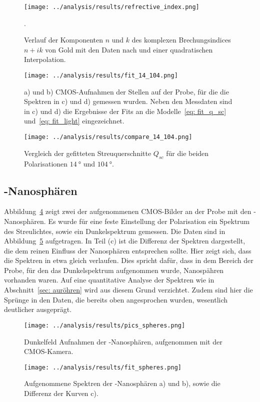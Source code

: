 \begin{figure}
  \centering
  \texttt{[image: ../analysis/results/refrective\_index.png]}
  \caption{Verlauf der Komponenten $n$ und $k$ des komplexen Brechungsindices $n + i k$
  von Gold mit den Daten nach \cite{ref_index_au} und einer quadratischen Interpolation.}.
  \label{fig: ref_index}
\end{figure}


\begin{figure}
  \centering
  \texttt{[image: ../analysis/results/fit\_14\_104.png]}
  \caption{a) und b) CMOS-Aufnahmen der Stellen auf der Probe, für die die Spektren in c) und d)
  gemessen wurden. Neben den Messdaten sind in c) und d) die Ergebnisse der Fits an die Modelle~\eqref{eq: fit_q_sc}
  und~\eqref{eq: fit_light} eingezeichnet.}
  \label{fig: au_röhren_fits}
\end{figure}

\begin{figure}
  \centering
  \texttt{[image: ../analysis/results/compare\_14\_104.png]}
  \caption{Vergleich der gefitteten Streuquerschnitte $Q_{sc}$ für die beiden Polarisationen $\SI{14}{\degree}$ und $\SI{104}{\degree}$.}
  \label{fig: compare_q_sc}
\end{figure}



\subsection{-Nanosphären}
Abbildung~\ref{fig: au_sphären_bilder} zeigt zwei der aufgenommenen CMOS-Bilder an der Probe mit den -Nanosphären.
Es wurde für eine feste Einstellung der Polarisation ein Spektrum des Streulichtes, sowie ein
Dunkelspektrum gemessen. Die Daten sind in Abbildung~\ref{fig: au_sphären_data} aufgetragen. In Teil (c) ist die Differenz
der Spektren dargestellt, die dem reinen Einfluss der Nanosphären entsprechen sollte.
Hier zeigt sich, dass die Spektren in etwa gleich verlaufen.
Dies spricht dafür, dass in dem Bereich der Probe, für den das Dunkelspektrum aufgenommen wurde, Nanospähren
vorhanden waren.
Auf eine quantitative Analyse der Spektren wie in Abschnitt~\ref{sec: auröhren} wird aus diesem Grund verzichtet.
Zudem sind hier die Sprünge in den Daten, die bereits oben angesprochen wurden, wesentlich deutlicher
ausgeprägt.

\begin{figure}
  \centering
  \texttt{[image: ../analysis/results/pics\_spheres.png]}
  \caption{Dunkelfeld Aufnahmen der -Nanosphären, aufgenommen mit der CMOS-Kamera.}
  \label{fig: au_sphären_bilder}
\end{figure}

\begin{figure}
  \centering
  \texttt{[image: ../analysis/results/fit\_spheres.png]}
  \caption{Aufgenommene Spektren der -Nanosphären a) und b), sowie die Differenz der Kurven c).}
  \label{fig: au_sphären_data}
\end{figure}
